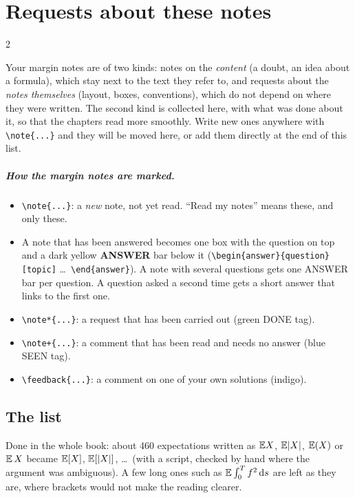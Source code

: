 \chapter*{Requests about these notes}\label{ch:requests}
\begin{paracol}{2}

Your margin notes are of two kinds: notes on the \emph{content} (a doubt, an idea about a formula),
which stay next to the text they refer to, and requests about the \emph{notes themselves} (layout,
boxes, conventions), which do not depend on where they were written. The second kind is collected here,
with what was done about it, so that the chapters read more smoothly. Write new ones anywhere with
\verb|\note{...}| and they will be moved here, or add them directly at the end of this list.

\paragraph{How the margin notes are marked.}
\begin{itemize}
  \item \verb|\note{...}|: a \emph{new} note, not yet read. ``Read my notes'' means these, and only these.
  \item A note that has been answered becomes one box with the question on top and a dark yellow
        \textbf{ANSWER} bar below it (\verb|\begin{answer}{question}[topic]| \dots\ \verb|\end{answer}|). A note with
        several questions gets one ANSWER bar per question. A question asked a second time gets a short
        answer that links to the first one.
  \item \verb|\note*{...}|: a request that has been carried out (green DONE tag).
  \item \verb|\note+{...}|: a comment that has been read and needs no answer (blue SEEN tag).
  \item \verb|\feedback{...}|: a comment on one of your own solutions (indigo).
\end{itemize}

\section*{The list}

{Done in the whole book: about 460 expectations written as $\mathbb{E} X$, $\mathbb{E}|X|$, $\mathbb{E}(X)$ or $\mathbb{E}\,X$ became $\mathbb{E}[X]$,
$\mathbb{E}[|X|]$, \dots\ (with a script, checked by hand where the argument was ambiguous). A few long ones such as
$\mathbb{E}\int_0^Tf^2\,\mathrm{d} s$ are left as they are, where brackets would not make the reading clearer.}


\end{paracol}
